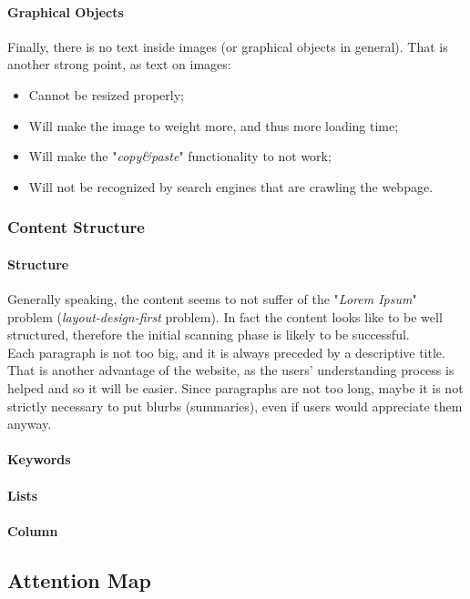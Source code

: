 \paragraph{Graphical Objects}
Finally, there is no text inside images (or graphical objects in general). That is another strong point, as text on images:
\begin{itemize}
\item Cannot be resized properly;
\item Will make the image to weight more, and thus more loading time;
\item Will make the "\textit{copy\&paste}" functionality to not work;
\item Will not be recognized by search engines that are crawling the webpage.
\end{itemize}

\subsubsection{Content Structure}
\paragraph{Structure}
Generally speaking, the content seems to not suffer of the "\textit{Lorem Ipsum}" problem (\textit{layout-design-first} problem). In fact the content looks like to be well structured, therefore the initial scanning phase is likely to be successful.\\
Each paragraph is not too big, and it is always preceded by a descriptive title. That is another advantage of the website, as the users' understanding process is helped and so it will be easier. Since paragraphs are not too long, maybe it is not strictly necessary to put blurbs (summaries), even if users would appreciate them anyway.

\paragraph{Keywords}

\paragraph{Lists}

\paragraph{Column}

\subsection{Attention Map}

